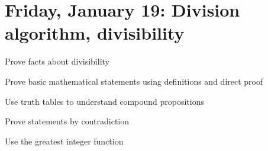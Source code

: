\documentclass{ximera}
\begin{document}
\section{Friday, January 19: Division algorithm, divisibility}%

\begin{obj}
\item Prove facts about divisibility
\item Prove basic mathematical statements using definitions and direct proof
\item Use truth tables to understand compound propositions
\item Prove statements by contradiction
\item Use the greatest integer function
 \end{obj}
 
\end{document}
